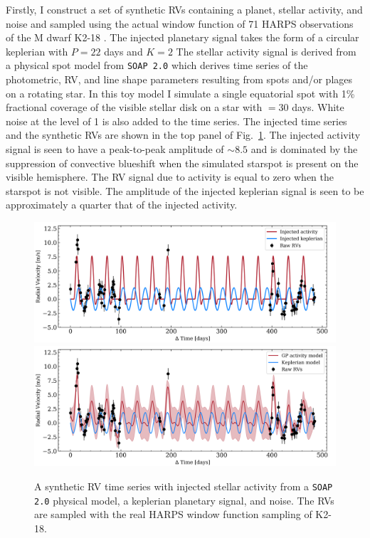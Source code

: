 Firstly, I construct
a set of synthetic RVs containing a planet, stellar activity, and noise and sampled using the
actual window function of 71 HARPS observations of the M dwarf K2-18 \citep{cloutier17b}.
The injected planetary
signal takes the form of a circular keplerian with $P=22$ days and $K=2$  The stellar
activity signal is derived from a physical spot model from \texttt{SOAP 2.0} \citep{dumusque14}
which derives time series of the photometric, RV, and line shape parameters resulting from
spots and/or plages on a rotating star. In this toy model I simulate a single equatorial spot
with 1\% fractional coverage of the visible stellar disk on a star with \prot{}$=30$ days.
White noise at the level of 1 \mps{} is also added to the time series.
The injected time series and the synthetic RVs are shown in the top panel of
Fig.~\ref{fig:RVsignals}. The injected activity signal is seen to have a peak-to-peak amplitude of
$\sim 8.5$ \mps{} and is dominated by the suppression of convective blueshift when the simulated
starspot is present on the visible hemisphere. The RV signal due to activity is equal to zero when
the starspot is not visible. The amplitude of the injected keplerian signal is seen to be
approximately a quarter that of the injected activity. \\

\begin{figure}
  \centering
  \includegraphics[width=\hsize]{figures/RVinjected.png}
  \includegraphics[width=\hsize]{figures/RVrecovered.png}
  \caption[Synthetic RV time series used to demonstrate the effectiveness of GP activity modelling.]
          {A synthetic RV time series with injected stellar activity from a \texttt{SOAP 2.0} physical
            model, a keplerian planetary signal, and noise. The RVs are sampled with the real HARPS window
            function sampling of K2-18.}
  \label{fig:RVsignals}
\end{figure}

